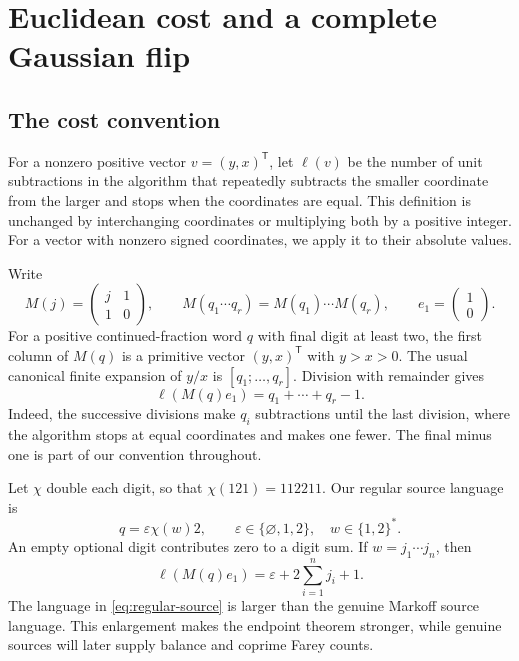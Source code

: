 \section{Euclidean cost and a complete Gaussian flip}
\label{sec:cost-reflections}

\subsection{The cost convention}

For a nonzero positive vector $v=(y,x)^{\mathsf T}$, let $\ell(v)$ be the
number of unit subtractions in the algorithm that repeatedly subtracts
the smaller coordinate from the larger and stops when the coordinates
are equal. This definition is unchanged by interchanging coordinates or
multiplying both by a positive integer. For a vector with nonzero signed
coordinates, we apply it to their absolute values.

Write
\begin{equation}
 M(j)=\begin{pmatrix}j&1\\1&0\end{pmatrix},\qquad
 M(q_1\cdots q_r)=M(q_1)\cdots M(q_r),\qquad
 e_1=\begin{pmatrix}1\\0\end{pmatrix}.
 \label{eq:digit-matrix}
\end{equation}
For a positive continued-fraction word $q$ with final digit at least two,
the first column of $M(q)$ is a primitive vector $(y,x)^{\mathsf T}$ with
$y>x>0$. The usual canonical finite expansion of $y/x$ is $[q_1;\ldots,q_r]$.
Division with remainder gives
\begin{equation}
 \ell(M(q)e_1)=q_1+\cdots+q_r-1.
 \label{eq:euclidean-cost}
\end{equation}
Indeed, the successive divisions make $q_i$ subtractions until the last
division, where the algorithm stops at equal coordinates and makes one
fewer. The final minus one is part of our convention throughout.

Let $\chi$ double each digit, so that $\chi(121)=112211$. Our regular source
language is
\begin{equation}
 q=\varepsilon\chi(w)2,\qquad
 \varepsilon\in\{\varnothing,1,2\},\quad w\in\{1,2\}^*.
 \label{eq:regular-source}
\end{equation}
An empty optional digit contributes zero to a digit sum. If $w=j_1\cdots j_n$,
then
\begin{equation}
 \ell(M(q)e_1)=\varepsilon+2\sum_{i=1}^n j_i+1.
 \label{eq:paired-cost}
\end{equation}
The language in \eqref{eq:regular-source} is larger than the genuine
Markoff source language. This enlargement makes the endpoint theorem
stronger, while genuine sources will later supply balance and coprime
Farey counts.

